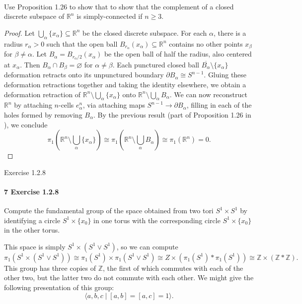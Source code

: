 \documentclass[12pt]{article}
\newlength{\myparskip}
\newenvironment{fullbox}{\begin{lrbox}{\savefullbox}\begin{minipage}{\dimexpr\textwidth-2\fboxsep\relax}\setlength{\parskip}{\myparskip}}{\end{minipage}\end{lrbox}\framebox[\textwidth]{\usebox{\savefullbox}}}
\newenvironment{pbox}[1][]{\begin{fullbox}\ifx#1\empty\else\paragraph{#1}\phantom{}\fi}{\end{fullbox}}
\theoremstyle{definition}
\newcommand{\Z}{\mathbb{Z}}
\newcommand{\R}{\mathbb{R}}
\renewcommand{\emptyset}{\varnothing}
\newcommand{\<}{\langle}
\renewcommand{\>}{\rangle}
\newcommand{\isom}{\cong}
\newcommand{\clo}{\overline}
\newcommand{\seq}{\subseteq}
\newcommand{\bd}{\partial}
\begin{document}
\begin{pbox}
    Use Proposition 1.26 to show that to show that the complement of a closed discrete subspace of $\R^n$ is simply-connected if $n \geq 3$.
\end{pbox}

\begin{proof}
    Let $\bigcup_\alpha\{x_\alpha\} \seq \R^n$ be the closed discrete subspace.
    For each $\alpha$, there is a radius $r_\alpha > 0$ such that the open ball $B_{r_\alpha}(x_\alpha) \seq \R^n$ contains no other points $x_\beta$ for $\beta \ne \alpha$.
    Let $B_\alpha = B_{r_\alpha/2}(x_\alpha)$ be the open ball of half the radius, also centered at $x_\alpha$.
    Then $B_\alpha \cap B_\beta = \emptyset$ for $\alpha \ne \beta$.
    Each punctured closed ball $\clo{B_\alpha} \setminus \{x_\alpha\}$ deformation retracts onto its unpunctured boundary $\bd B_\alpha \isom S^{n-1}$.
    Gluing these deformation retractions together and taking the identity elsewhere, we obtain a deformation retraction of $\R^n \setminus \bigcup_\alpha \{x_\alpha\}$ onto $\R^n \setminus \bigcup_\alpha B_\alpha$.
    We can now reconstruct $\R^n$ by attaching $n$-cells $e^n_\alpha$, via attaching maps $S^{n-1} \to \bd B_\alpha$, filling in each of the holes formed by removing $B_\alpha$.
    By the previous result (part of Proposition 1.26 in ), we conclude
    \[\textstyle
        \pi_1(\R^n \setminus \bigcup_\alpha \{x_\alpha\})
            \isom \pi_1(\R^n \setminus \bigcup_\alpha B_\alpha)
            \isom \pi_1(\R^n)
            = 0.
    \]
\end{proof}


\begin{pbox}[7 Exercise 1.2.8]
    Compute the fundamental group of the space obtained from two tori $S^1 \times S^1$ by identifying a circle $S^1 \times \{x_0\}$ in one torus with the corresponding circle $S^1 \times \{x_0\}$ in the other torus.
\end{pbox}

This space is simply $S^1 \times (S^1 \vee S^1)$, so we can compute
\[
    \pi_1(S^1 \times (S^1 \vee S^1))
        \isom \pi_1(S^1) \times \pi_1(S^1 \vee S^1)
        \isom Z \times (\pi_1(S^1) * \pi_1(S^1))
        \isom \Z \times (\Z * \Z).
\]
This group has three copies of $\Z$, the first of which commutes with each of the other two, but the latter two do not commute with each other.
We might give the following presentation of this group:
\[
    \<a, b, c \mid [a, b] = [a, c] = 1\>.
\]
\end{document}
